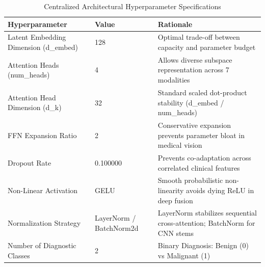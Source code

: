\begin{table}
\caption{Centralized Architectural Hyperparameter Specifications}
\begin{tabular}{lll}
\toprule
Hyperparameter & Value & Rationale \\
\midrule
Latent Embedding Dimension (d_embed) & 128 & Optimal trade-off between capacity and parameter budget \\
Attention Heads (num_heads) & 4 & Allows diverse subspace representation across 7 modalities \\
Attention Head Dimension (d_k) & 32 & Standard scaled dot-product stability (d_embed / num_heads) \\
FFN Expansion Ratio & 2 & Conservative expansion prevents parameter bloat in medical vision \\
Dropout Rate & 0.100000 & Prevents co-adaptation across correlated clinical features \\
Non-Linear Activation & GELU & Smooth probabilistic non-linearity avoids dying ReLU in deep fusion \\
Normalization Strategy & LayerNorm / BatchNorm2d & LayerNorm stabilizes sequential cross-attention; BatchNorm for CNN stems \\
Number of Diagnostic Classes & 2 & Binary Diagnosis: Benign (0) vs Malignant (1) \\
\bottomrule
\end{tabular}
\end{table}
